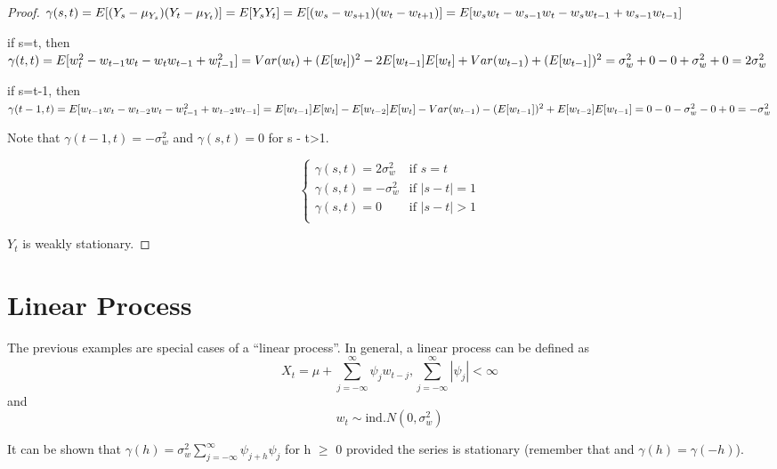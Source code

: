 \documentclass[
]{book}
\theoremstyle{definition}
\theoremstyle{definition}
\theoremstyle{definition}
\theoremstyle{definition}
\theoremstyle{remark}
\begin{document}
\begin{proof}
\(\gamma(s,t)=E[(Y_s-\mu_{Y_s})(Y_t-\mu_{Y_t})]=E[Y_sY_t]\\=E[(w_s-w_{s+1})(w_t-w_{t+1})]=\\E[w_sw_t-w_{s-1}w_t-w_sw_{t-1}+w_{s-1}w_{t-1}]\)

if s=t, then \(\gamma(t,t)=E[w^2_t- w_{t-1}w_t - w_tw_{t-1} + w^2_{t-1}]\\= Var(w_t) + (E[w_t])^2 - 2E[w_{t-1}]E[w_t] + Var(w_{t-1}) + (E[w_{t-1}])^2\\= \sigma^2_w + 0 - 0 + \sigma^2_w + 0= 2\sigma^2_w\)

if s=t-1, then \(\gamma(t-1,t)=E[w_{t-1}w_t- w_{t-2}w_t - w^2_{t-1} + w_{t-2}w_{t-1}]\\ = E[w_{t-1}]E[w_t] - E[w_{t-2}]E[w_t] - Var(w_{t-1}) -(E[w_{t-1}])^2 + E[w_{t-2}]E[w_{t-1}]\\= 0 - 0 - \sigma^2_w - 0+0=-\sigma^2_w\)

Note that \(\gamma(t - 1, t) = -\sigma^2_w\) and \(\gamma(s,t) = 0\) for \textbar s - t\textbar\textgreater1.

\[\begin{cases}
  \gamma(s,t)= 2\sigma^2_w & \text{if } s=t \\
  \gamma(s,t)= -\sigma^2_w & \text{if } |s-t|=1\\
  \gamma(s,t)= 0 & \text{if } |s-t| > 1\\
\end{cases}\]

\(Y_t\) is weakly stationary.

\end{proof}

\hypertarget{linear-process}{%
\section{Linear Process}\label{linear-process}}

The previous examples are special cases of a ``linear process''. In general, a linear process can be defined as \[X_t=\mu+ \sum_{j=-\infty}^{\infty} \psi_jw_{t-j}, \sum_{j=-\infty}^{\infty}|\psi_j|<\infty\] and \[w_t\sim\mathrm{ind.}N(0,\sigma^2_w)\]

It can be shown that \(\gamma(h)=\sigma^2_w\sum_{j=-\infty}^{\infty}\psi_{j+h}\psi_j\) for h \(\geq\) 0 provided the series is stationary (remember that and \(\gamma(h) = \gamma(-h)\)).
\end{document}
